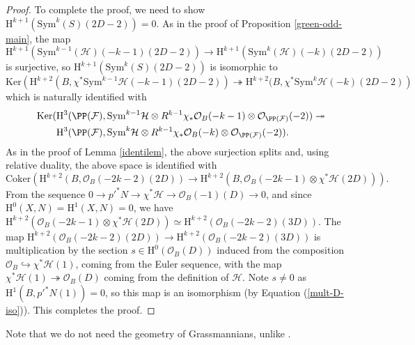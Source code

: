 \begin{proof}
To complete the proof, we need to show $\mathrm{H}^{k+1}(\mathrm{Sym}^k(S)(2D-2))=0$. As in the proof of Proposition \ref{green-odd-main}, the map
$$\mathrm{H}^{k+1}(\mathrm{Sym}^{k-1}(\mathcal{H})(-k-1)(2D-2))\to \mathrm{H}^{k+1}(\mathrm{Sym}^{k}(\mathcal{H})(-k)(2D-2))$$
is surjective, so $\mathrm{H}^{k+1}(\mathrm{Sym}^k(S)(2D-2))$ is isomorphic to
$$ \mathrm{Ker}\left(  \mathrm{H}^{k+2}(B,\chi^*\mathrm{Sym}^{k-1}\mathcal{H}(-k-1)(2D-2))\twoheadrightarrow \mathrm{H}^{k+2}(B,\chi^*\mathrm{Sym}^{k}\mathcal{H}(-k)(2D-2) \right)$$
which is naturally identified with
{\small{
\begin{align*} \mathrm{Ker}(  &\mathrm{H}^{3}(\PP(\mathcal{F}),\mathrm{Sym}^{k-1}\mathcal{H}\otimes R^{k-1}\chi_*\mathcal{O}_B(-k-1)\otimes \mathcal{O}_{\PP(\mathcal{F})}(-2))\twoheadrightarrow \\
& \mathrm{H}^{3}(\PP(\mathcal{F}), \mathrm{Sym}^{k}\mathcal{H} \otimes R^{k-1}\chi_*\mathcal{O}_B(-k)\otimes \mathcal{O}_{\PP(\mathcal{F})}(-2) ).
\end{align*}
}}
As in the proof of Lemma \ref{identilem}, the above surjection splits and, using relative duality, the above space is identified with
$$\mathrm{Coker}\left( \mathrm{H}^{k+2}(B,\mathcal{O}_B(-2k-2)(2D)) \to \mathrm{H}^{k+2}(B,\mathcal{O}_B(-2k-1)\otimes \chi^* \mathcal{H}(2D))\right).$$
From the sequence $0 \to {p'}^*N \to \chi^*\mathcal{H} \to \mathcal{O}_B(-1)(D) \to 0$, and since $\mathrm{H}^0(X,N)=\mathrm{H}^1(X,N)=0$, we have $\mathrm{H}^{k+2}(\mathcal{O}_B(-2k-1)\otimes \chi^* \mathcal{H}(2D)) \simeq \mathrm{H}^{k+2}(\mathcal{O}_B(-2k-2)(3D))$. The map
$ \mathrm{H}^{k+2}(\mathcal{O}_B(-2k-2)(2D)) \to  \mathrm{H}^{k+2}(\mathcal{O}_B(-2k-2)(3D))$ is multiplication by the section $s \in \mathrm{H}^0(\mathcal{O}_B(D))$ induced from the composition $\mathcal{O}_B \hookrightarrow \chi^*\mathcal{H}(1)$, coming from the Euler sequence, with the map $\chi^*\mathcal{H}(1) \twoheadrightarrow \mathcal{O}_B(D)$ coming from the definition of $\mathcal{H}$. Note $s \neq 0$ as $\mathrm{H}^1(B,{p'}^*N(1))=0$, so this map is an isomorphism (by Equation (\ref{mult-D-iso})). This completes the proof.



\end{proof}
\begin{rem}
\notready
Note that we do not need the geometry of Grassmannians, unlike \cite[\S 3, Fourth step]{V2}.
\end{rem}

